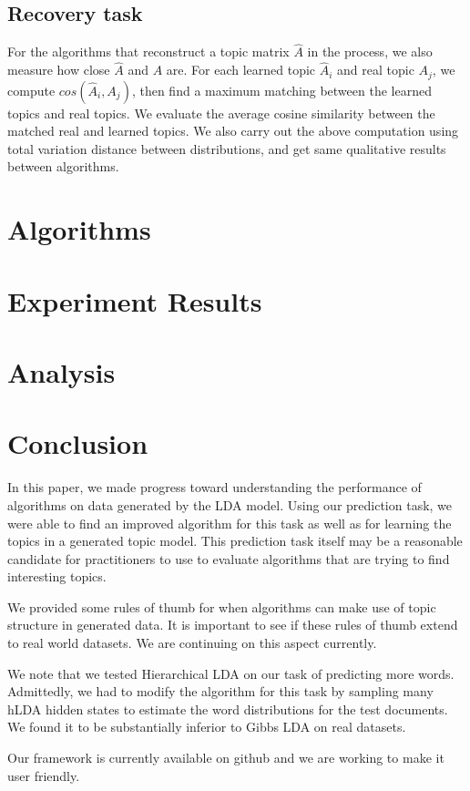 \documentclass{sig-alternate}
\begin{document}
\subsection{Recovery task}
For the algorithms that reconstruct a topic matrix $\hat{A}$ in the
process, we also measure how close $\hat{A}$ and $A$ are. For each
learned topic $\hat{A}_i$ and real topic $A_j$, we compute
$cos(\hat{A}_i,A_j)$, then find a maximum matching between the learned
topics and real topics. We evaluate the average cosine similarity
between the matched real and learned topics. We also carry out the
above computation using total variation distance between
distributions, and get same qualitative results between algorithms.

\section{Algorithms}
\label{sec:algs}

\section{Experiment Results}
\label{sec:results}


\section{Analysis}
\label{sec:analysis}


\section{Conclusion}
\label{sec:conclusion}

In this paper, we made progress toward understanding the performance
of algorithms on data generated by the LDA model.  Using our
prediction task, we were able to find an improved algorithm for this
task as well as for learning the topics in a generated topic model.
This prediction task itself may be a reasonable candidate for
practitioners to use to evaluate algorithms that are trying to find
interesting topics.

We provided some rules of thumb for when algorithms can make use of
topic structure in generated data.  It is important to see if these
rules of thumb extend to real world datasets.  We are continuing on
this aspect currently.

We note that we tested Hierarchical LDA on our task
of predicting more words.  Admittedly, we had to
modify the algorithm for this task by sampling
many hLDA hidden states to estimate the word
distributions for the test documents.  We found
it to be substantially inferior to Gibbs LDA
on real datasets. 

Our framework is currently available on github and we are working to
make it user friendly. 




\end{document}
